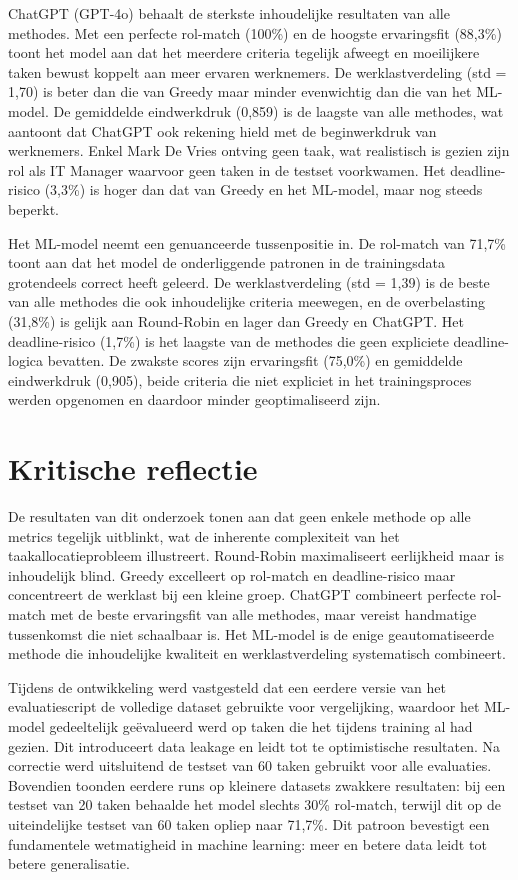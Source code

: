 ChatGPT (GPT-4o) behaalt de sterkste inhoudelijke resultaten van alle methodes. Met een perfecte rol-match (100\%) en de hoogste ervaringsfit (88,3\%) toont het model aan dat het meerdere criteria tegelijk afweegt en moeilijkere taken bewust koppelt aan meer ervaren werknemers. De werklastverdeling (std = 1,70) is beter dan die van Greedy maar minder evenwichtig dan die van het ML-model. De gemiddelde eindwerkdruk (0,859) is de laagste van alle methodes, wat aantoont dat ChatGPT ook rekening hield met de beginwerkdruk van werknemers. Enkel Mark De Vries ontving geen taak, wat realistisch is gezien zijn rol als IT Manager waarvoor geen taken in de testset voorkwamen. Het deadline-risico (3,3\%) is hoger dan dat van Greedy en het ML-model, maar nog steeds beperkt.

Het ML-model neemt een genuanceerde tussenpositie in. De rol-match van 71,7\% toont aan dat het model de onderliggende patronen in de trainingsdata grotendeels correct heeft geleerd. De werklastverdeling (std = 1,39) is de beste van alle methodes die ook inhoudelijke criteria meewegen, en de overbelasting (31,8\%) is gelijk aan Round-Robin en lager dan Greedy en ChatGPT. Het deadline-risico (1,7\%) is het laagste van de methodes die geen expliciete deadline-logica bevatten. De zwakste scores zijn ervaringsfit (75,0\%) en gemiddelde eindwerkdruk (0,905), beide criteria die niet expliciet in het trainingsproces werden opgenomen en daardoor minder geoptimaliseerd zijn.

\section{Kritische reflectie}
\vspace{1em}De resultaten van dit onderzoek tonen aan dat geen enkele methode op alle metrics tegelijk uitblinkt, wat de inherente complexiteit van het taakallocatieprobleem illustreert. Round-Robin maximaliseert eerlijkheid maar is inhoudelijk blind. Greedy excelleert op rol-match en deadline-risico maar concentreert de werklast bij een kleine groep. ChatGPT combineert perfecte rol-match met de beste ervaringsfit van alle methodes, maar vereist handmatige tussenkomst die niet schaalbaar is. Het ML-model is de enige geautomatiseerde methode die inhoudelijke kwaliteit en werklastverdeling systematisch combineert.

Tijdens de ontwikkeling werd vastgesteld dat een eerdere versie van het evaluatiescript de volledige dataset gebruikte voor vergelijking, waardoor het ML-model gedeeltelijk geëvalueerd werd op taken die het tijdens training al had gezien. Dit introduceert data leakage en leidt tot te optimistische resultaten. Na correctie werd uitsluitend de testset van 60 taken gebruikt voor alle evaluaties. Bovendien toonden eerdere runs op kleinere datasets zwakkere resultaten: bij een testset van 20 taken behaalde het model slechts 30\% rol-match, terwijl dit op de uiteindelijke testset van 60 taken opliep naar 71,7\%. Dit patroon bevestigt een fundamentele wetmatigheid in machine learning: meer en betere data leidt tot betere generalisatie.

